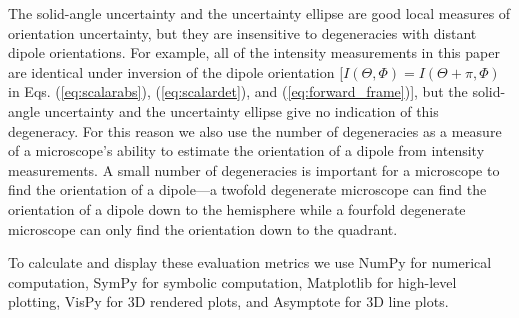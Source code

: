 \documentclass[10pt]{article}
\begin{document}
The solid-angle uncertainty and the uncertainty ellipse are good local measures
of orientation uncertainty, but they are insensitive to degeneracies with
distant dipole orientations. For example, all of the intensity measurements in
this paper are identical under inversion of the dipole orientation
{\color{urlblue}[}$I(\Theta, \Phi) = I(\Theta + \pi, \Phi)$ in {\color{urlblue}Eqs.} (\ref{eq:scalarabs}),
(\ref{eq:scalardet}), and (\ref{eq:forward_frame}){\color{urlblue}]}, but the solid-angle uncertainty
and the uncertainty ellipse give no indication of this degeneracy. For this
reason we also use the number of degeneracies as a measure of a microscope's
ability to estimate the orientation of a dipole from intensity measurements. A
small number of degeneracies is important for a microscope to find the
orientation of a dipole---a twofold degenerate microscope can find the
orientation of a dipole down to the hemisphere while a fourfold degenerate
microscope can only find the orientation down to the quadrant.

To calculate and display these evaluation metrics we use NumPy \cite{walt2011}
for numerical computation, SymPy \cite{meurer2017} for symbolic computation,
Matplotlib \cite{hunter2007} for high-level plotting, VisPy \cite{vispy} for 3D
rendered plots, and Asymptote \cite{bowman2008} for 3D line plots.
\end{document}
